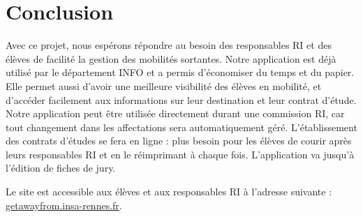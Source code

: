 \chapter{Conclusion}

Avec ce projet, nous espérons répondre au besoin des responsables RI et des élèves de facilité la gestion des mobilités sortantes. Notre application est déjà utilisé par le département INFO et a permis d'économiser du temps et du papier. Elle permet aussi d'avoir une meilleure visibilité des élèves en mobilité, et d'accéder facilement aux informations sur leur destination et leur contrat d'étude. Notre application peut être utilisée directement durant une commission RI, car tout changement dans les affectations sera automatiquement géré. L'établissement des contrats d'études se fera en ligne : plus besoin pour les élèves de courir après leurs responsables RI et en le réimprimant à chaque fois. L'application va jusqu'à l'édition de fiches de jury.

Le site est accessible aux élèves et aux responsables RI à l'adresse suivante : \href{https://getawayfrom.insa-rennes.fr}{getawayfrom.insa-rennes.fr}.